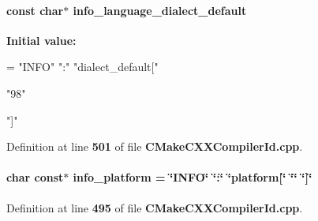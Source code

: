 \paragraph[{info\+\_\+language\+\_\+dialect\+\_\+default}]{\setlength{\rightskip}{0pt plus 5cm}const char$\ast$ info\+\_\+language\+\_\+dialect\+\_\+default}\label{gr-radar-dev_2build_2CMakeFiles_23_85_81_2CompilerIdCXX_2CMakeCXXCompilerId_8cpp_a1ce162bad2fe6966ac8b33cc19e120b8}
{\bfseries Initial value\+:}
\begin{DoxyCode}
= \textcolor{stringliteral}{"INFO"} \textcolor{stringliteral}{":"} \textcolor{stringliteral}{"dialect\_default["}





  \textcolor{stringliteral}{"98"}

\textcolor{stringliteral}{"]"}
\end{DoxyCode}


Definition at line {\bf 501} of file {\bf C\+Make\+C\+X\+X\+Compiler\+Id.\+cpp}.

\paragraph[{info\+\_\+platform}]{\setlength{\rightskip}{0pt plus 5cm}char const$\ast$ info\+\_\+platform = \char`\"{}I\+N\+FO\char`\"{} \char`\"{}\+:\char`\"{} \char`\"{}platform[\char`\"{} \char`\"{}\char`\"{} \char`\"{}]\char`\"{}}\label{gr-radar-dev_2build_2CMakeFiles_23_85_81_2CompilerIdCXX_2CMakeCXXCompilerId_8cpp_a2321403dee54ee23f0c2fa849c60f7d4}


Definition at line {\bf 495} of file {\bf C\+Make\+C\+X\+X\+Compiler\+Id.\+cpp}.

